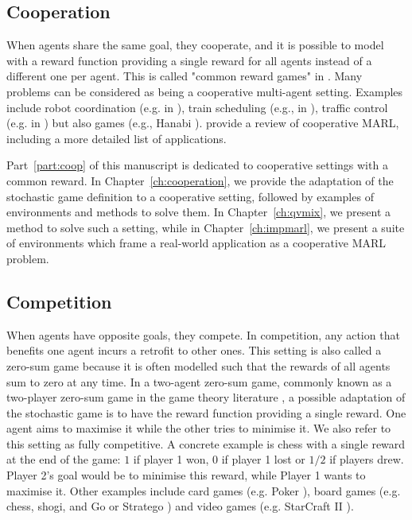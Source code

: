 \subsection{Cooperation} 
\label{sec:ch2_Cooperation}
When agents share the same goal, they cooperate, and it is possible to model with a reward function providing a single reward for all agents instead of a different one per agent.
This is called "common reward games" in \citep{marl-book}.
Many problems can be considered as being a cooperative multi-agent setting.
Examples include robot coordination (e.g. in \citep{papoudakis2021benchmarking}), train scheduling (e.g., in \citep{mohanty2020flatland}), traffic control (e.g. in \citep{zhang2019cityflow}) but also games (e.g., Hanabi \citep{Bard_2020}).
\citet{oroojlooy2022review} provide a review of cooperative MARL, including a more detailed list of applications.

Part~\ref{part:coop} of this manuscript is dedicated to cooperative settings with a common reward.
In Chapter~\ref{ch:cooperation}, we provide the adaptation of the stochastic game definition to a cooperative setting, followed by examples of environments and methods to solve them.
In Chapter~\ref{ch:qvmix}, we present a method to solve such a setting, while in Chapter~\ref{ch:impmarl}, we present a suite of environments which frame a real-world application as a cooperative MARL problem.

\subsection{Competition} 
\label{sec:ch2_Competition}
When agents have opposite goals, they compete.
In competition, any action that benefits one agent incurs a retrofit to other ones.
This setting is also called a zero-sum game \citep{marl-book} because it is often modelled such that the rewards of all agents sum to zero at any time.
In a two-agent zero-sum game, commonly known as a two-player zero-sum game in the game theory literature \citep{russel2010}, a possible adaptation of the stochastic game is to have the reward function providing a single reward.
One agent aims to maximise it while the other tries to minimise it.
We also refer to this setting as fully competitive.
A concrete example is chess with a single reward at the end of the game: $1$ if player 1 won, $0$ if player 1 lost or $1/2$ if players drew.
Player 2's goal would be to minimise this reward, while Player 1 wants to maximise it.
Other examples include card games (e.g. Poker \citep{poker}), board games (e.g. chess, shogi, and Go \citep{silver2018general} or Stratego \citep{stratego}) and video games (e.g. StarCraft II \citep{vinyals2019grandmaster}).


